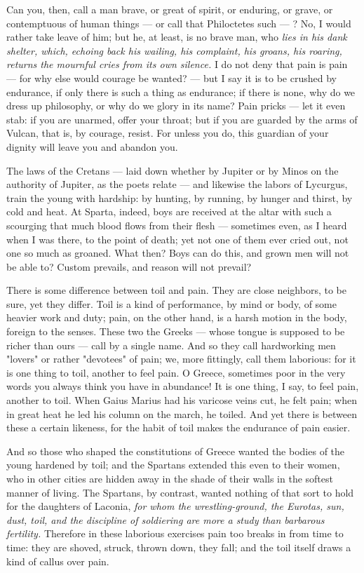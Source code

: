  Can you, then, call a man brave, or great of spirit, or enduring, or grave, or contemptuous of human things — or call that Philoctetes such — ? No, I would rather take leave of him; but he, at least, is no brave man, who \textit{lies in his dank shelter, which, echoing back his wailing, his complaint, his groans, his roaring, returns the mournful cries from its own silence.} I do not deny that pain is pain — for why else would courage be wanted? — but I say it is to be crushed by endurance, if only there is such a thing as endurance; if there is none, why do we dress up philosophy, or why do we glory in its name? Pain pricks — let it even stab: if you are unarmed, offer your throat; but if you are guarded by the arms of Vulcan, that is, by courage, resist. For unless you do, this guardian of your dignity will leave you and abandon you.

 The laws of the Cretans — laid down whether by Jupiter or by Minos on the authority of Jupiter, as the poets relate — and likewise the labors of Lycurgus, train the young with hardship: by hunting, by running, by hunger and thirst, by cold and heat. At Sparta, indeed, boys are received at the altar with such a scourging that much blood flows from their flesh — sometimes even, as I heard when I was there, to the point of death; yet not one of them ever cried out, not one so much as groaned. What then? Boys can do this, and grown men will not be able to? Custom prevails, and reason will not prevail?

 There is some difference between toil and pain. They are close neighbors, to be sure, yet they differ. Toil is a kind of performance, by mind or body, of some heavier work and duty; pain, on the other hand, is a harsh motion in the body, foreign to the senses. These two the Greeks — whose tongue is supposed to be richer than ours — call by a single name. And so they call hardworking men "lovers" or rather "devotees" of pain; we, more fittingly, call them laborious: for it is one thing to toil, another to feel pain. O Greece, sometimes poor in the very words you always think you have in abundance! It is one thing, I say, to feel pain, another to toil. When Gaius Marius had his varicose veins cut, he felt pain; when in great heat he led his column on the march, he toiled. And yet there is between these a certain likeness, for the habit of toil makes the endurance of pain easier.

 And so those who shaped the constitutions of Greece wanted the bodies of the young hardened by toil; and the Spartans extended this even to their women, who in other cities are hidden away in the shade of their walls in the softest manner of living. The Spartans, by contrast, wanted nothing of that sort to hold for the daughters of Laconia, \textit{for whom the wrestling-ground, the Eurotas, sun, dust, toil, and the discipline of soldiering are more a study than barbarous fertility.} Therefore in these laborious exercises pain too breaks in from time to time: they are shoved, struck, thrown down, they fall; and the toil itself draws a kind of callus over pain.

